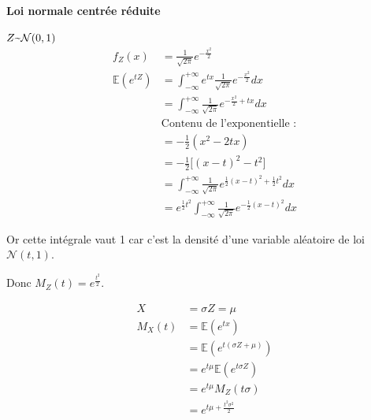 \documentclass{article}
\newcommand{\textapprox}{\raisebox{0.5ex}{\texttildelow}}
\begin{document}
\paragraph{Loi normale centrée réduite}
$Z \textapprox \mathcal{N}(0,1)$
\begin{align*}
  f_Z(x) &= \frac{1}{\sqrt{2 \pi}} e^{-\frac{x^2}{2}} \\
  \mathbb{E}(e^{tZ}) &= \int_{- \infty}^{+ \infty} e^{tx} \frac{1}{\sqrt{2 \pi}}e^{-\frac{x^2}{2}}dx \\
  &= \int_{- \infty}^{+ \infty} \frac{1}{\sqrt{2 \pi}} e^{-\frac{x^2}{2} + tx} dx \\
  &\text{Contenu de l'exponentielle :} \\
  &= - \frac{1}{2}(x^2 -2tx) \\
  &= - \frac{1}{2} \bigg[(x-t)^2 - t^2 \bigg] \\
  &= \int_{- \infty}^{+ \infty} \frac{1}{\sqrt{2 \pi}} e^{\frac{1}{2}(x-t)^2 + \frac{1}{2}t^2}dx \\
  &= e^{\frac{1}{2}t^2} \int_{- \infty}^{+ \infty} \frac{1}{\sqrt{2 \pi}} e^{- \frac{1}{2}(x-t)^2}dx
\end{align*}

Or cette intégrale vaut 1 car c'est la densité d'une variable aléatoire de loi $\mathcal{N}(t,1)$.

Donc $M_Z(t) = e^{\frac{t^2}{2}}$.

\begin{align*}
  X &= \sigma Z = \mu \\
  M_X(t) &= \mathbb{E}(e^{tx}) \\
  &= \mathbb{E}(e^{t(\sigma Z + \mu)}) \\
  &= e^{t \mu} \mathbb{E}(e^{t \sigma Z}) \\
  &= e^{t \mu}M_Z(t \sigma) \\
  &= e^{t \mu + \frac{t^2 \sigma^2}{2}}
\end{align*}
\end{document}
